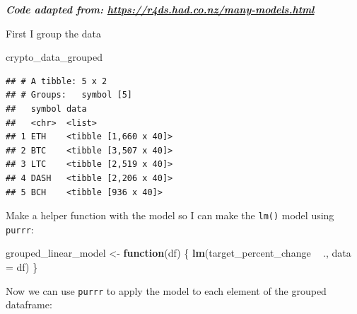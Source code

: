 \documentclass[
]{book}
\newenvironment{Shaded}{\begin{snugshade}}{\end{snugshade}}
\newcommand{\ControlFlowTok}[1]{\textcolor[rgb]{0.13,0.29,0.53}{\textbf{#1}}}
\newcommand{\DataTypeTok}[1]{\textcolor[rgb]{0.13,0.29,0.53}{#1}}
\newcommand{\KeywordTok}[1]{\textcolor[rgb]{0.13,0.29,0.53}{\textbf{#1}}}
\newcommand{\NormalTok}[1]{#1}
\newcommand{\OperatorTok}[1]{\textcolor[rgb]{0.81,0.36,0.00}{\textbf{#1}}}
\newcommand{\StringTok}[1]{\textcolor[rgb]{0.31,0.60,0.02}{#1}}
\begin{document}
\textbf{\emph{Code adapted from: \url{https://r4ds.had.co.nz/many-models.html}}}

First I group the data

\begin{Shaded}
\end{Shaded}

\begin{Shaded}
\begin{Highlighting}[]
\NormalTok{crypto_data_grouped}
\end{Highlighting}
\end{Shaded}

\begin{verbatim}
## # A tibble: 5 x 2
## # Groups:   symbol [5]
##   symbol data                 
##   <chr>  <list>               
## 1 ETH    <tibble [1,660 x 40]>
## 2 BTC    <tibble [3,507 x 40]>
## 3 LTC    <tibble [2,519 x 40]>
## 4 DASH   <tibble [2,206 x 40]>
## 5 BCH    <tibble [936 x 40]>
\end{verbatim}

Make a helper function with the model so I can make the \texttt{lm()} model using \texttt{purrr}:

\begin{Shaded}
\begin{Highlighting}[]
\NormalTok{grouped_linear_model <-}\StringTok{ }\ControlFlowTok{function}\NormalTok{(df) \{}
  \KeywordTok{lm}\NormalTok{(target_percent_change }\OperatorTok{~}\StringTok{ }\NormalTok{., }\DataTypeTok{data =}\NormalTok{ df)}
\NormalTok{\}}
\end{Highlighting}
\end{Shaded}

Now we can use \texttt{purrr}\citep{R-purrr} to apply the model to each element of the grouped dataframe:

\begin{Shaded}
\end{Shaded}
\end{document}
